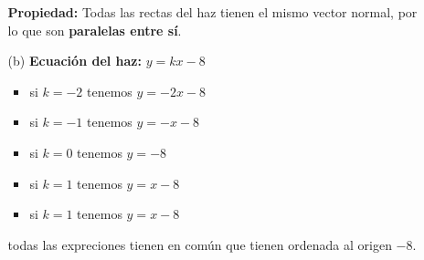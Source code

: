 \documentclass[11pt]{article}
\begin{document}
\begin{enumerate}[\hspace{-5mm} 1) ]
\begin{enumerate}
\begin{minipage}{.45\textwidth}
\begin{center}
    \end{center}
    \end{minipage}\qquad\begin{minipage}{.45\textwidth}

         \textbf{Propiedad:} Todas las rectas del haz tienen el mismo vector normal, por lo que son \textbf{paralelas entre sí}.    
\end{minipage}     
     
    \item[(b)] \textbf{Ecuación del haz:} $y = kx - 8$
\begin{multicols}{2}
    \begin{itemize}
        \item si $k=-2$ tenemos $y = -2 x - 8$
        \item si $k=-1$ tenemos $y = -x - 8$
        \item si $k=0$ tenemos $y =  - 8$
        \item si $k=1$ tenemos $y = x - 8$        
        \item si $k=1$ tenemos $y = x - 8$
    \end{itemize}
todas las expreciones tienen en común que tienen ordenada al origen $-8$.

    
    
    \begin{center}
    \end{center}

\end{multicols}


\end{enumerate}
\end{enumerate}
\end{document}
